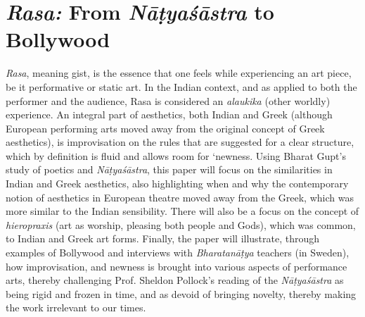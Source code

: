 \chapter[{\sl Rasa:} From \textsl{Nāṭyaśāstra} to Bollywood]{{\sl\bfseries Rasa:} From \textsl{Nāṭyaśāstra} to Bollywood}\label{chapter\thechapter:begin}

\medskip

\textsl{Rasa}, meaning gist, is the essence that one feels while experiencing an art piece, be it performative or static art. In the Indian context, and as applied to both the performer and the audience, Rasa is considered an \textsl{alaukika} (other worldly) experience. An integral part of aesthetics, both Indian and Greek (although European performing arts moved away from the original concept of Greek aesthetics), is improvisation on the rules that are suggested for a clear structure, which by definition is fluid and allows room for ‘newness. Using Bharat Gupt’s study of poetics and \textsl{Nāṭyaśāstra}, this paper will focus on the similarities in Indian and Greek aesthetics, also highlighting when and why the contemporary notion of aesthetics in European theatre moved away from the Greek, which was more similar to the Indian sensibility. There will also be a focus on the concept of \textsl{hieropraxis} (art as worship, pleasing both people and Gods), which was common, to Indian and Greek art forms. Finally, the paper will illustrate, through examples of Bollywood and interviews with \textsl{Bharatanāṭya} teachers (in Sweden), how improvisation, and newness is brought into various aspects of performance arts, thereby challenging Prof. Sheldon Pollock’s reading of the \textsl{Nāṭyaśāstra} as being rigid and frozen in time, and as devoid of bringing novelty, thereby making the work irrelevant to our times. 

\newpage

